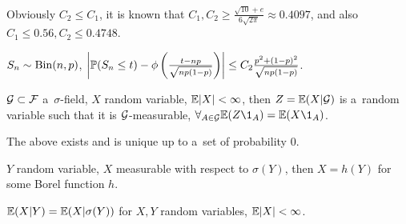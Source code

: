 	\begin{remark}
		Obviously $C_2 \leq C_1$, it is known that
		$C_1, C_2 \geq \frac{\sqrt{10}+e}{6 \sqrt{2\pi}} \approx 0.4097$,
		and also $C_1 \leq 0.56, C_2 \leq 0.4748$.
	\end{remark}
	
	\begin{example}
		$S_n \sim \mr{Bin}(n,p)$,
		$\left|\P(S_n \leq t) - \phi\left(\frac{t - np}{\sqrt{n p (1-p)}} \right) 
		\right| \leq C_2 \frac{p^2 + (1-p)^2}{\sqrt{np(1-p)}}$.
	\end{example}
	
	\begin{definition}
		$\G \subset \F$ a~$\sigma$-field, $X$ random variable, $\E |X|<\infty$,
		then $Z=\E(X|\G)$ is a~random variable such that
		it is $\G$-measurable, $\forall_{A \in \G} \E(Z \1_A) = \E(X \1_A)$.
	\end{definition}
	
	\begin{proposition}
		The above exists and is unique up to a~set of probability 0.
	\end{proposition}

	
	\begin{proposition}
		$Y$ random variable, $X$ measurable with respect to $\sigma(Y)$,
		then $X=h(Y)$ for some Borel function $h$.
	\end{proposition}
	
	\begin{definition}
		$\E(X|Y) = \E(X | \sigma(Y))$ for $X, Y$ random variables, $\E |X|<\infty$.
	\end{definition}



	
	

 
 
